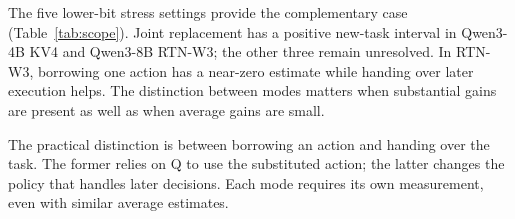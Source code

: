 The five lower-bit stress settings provide the complementary case (Table~\ref{tab:scope}). Joint replacement has a positive new-task interval in Qwen3-4B KV4 and Qwen3-8B RTN-W3; the other three remain unresolved. In RTN-W3, borrowing one action has a near-zero estimate while handing over later execution helps. The distinction between modes matters when substantial gains are present as well as when average gains are small.

The practical distinction is between borrowing an action and handing over the task. The former relies on Q to use the substituted action; the latter changes the policy that handles later decisions. Each mode requires its own measurement, even with similar average estimates.
